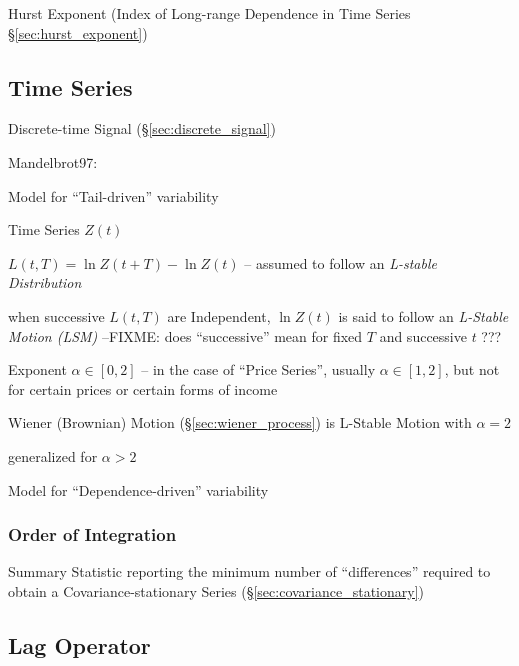 Hurst Exponent (Index of Long-range Dependence in Time Series
\S\ref{sec:hurst_exponent})



\subsection{Time Series}\label{sec:time_series}

Discrete-time Signal (\S\ref{sec:discrete_signal})

Mandelbrot97:


Model for ``Tail-driven'' variability

Time Series $Z(t)$

$L(t, T) = \ln Z(t+T) - \ln Z(t)$ -- assumed to follow an \emph{L-stable
  Distribution}

when successive $L(t, T)$ are Independent, $\ln Z(t)$ is said to follow an
\emph{L-Stable Motion (LSM)} --FIXME: does ``successive'' mean for fixed $T$ and
successive $t$ ???

Exponent $\alpha \in [0, 2]$ -- in the case of ``Price Series'', usually
$\alpha \in [1, 2]$, but not for certain prices or certain forms of income

Wiener (Brownian) Motion (\S\ref{sec:wiener_process}) is L-Stable Motion with
$\alpha = 2$

generalized for $\alpha > 2$

Model for ``Dependence-driven'' variability



\subsubsection{Order of Integration}\label{sec:order_of_integration}

Summary Statistic reporting the minimum number of ``differences'' required to
obtain a Covariance-stationary Series (\S\ref{sec:covariance_stationary})



\subsection{Lag Operator}\label{sec:lag_operator}

